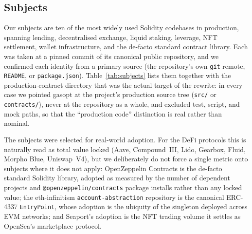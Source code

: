 
\subsection{Subjects}
\label{sec:subjects}

Our subjects are ten of the most widely used Solidity codebases in production, spanning
lending, decentralised exchange, liquid staking, leverage, NFT settlement, wallet
infrastructure, and the de-facto standard contract library. Each was taken at a pinned
commit of its canonical public repository, and we confirmed each identity from a primary
source (the repository's own \texttt{git} remote, \texttt{README}, or \texttt{package.json}).
Table~\ref{tab:subjects} lists them together with the production-contract directory that was
the actual target of the rewrite: in every case we pointed gasopt at the project's
production source tree (\texttt{src/} or \texttt{contracts/}), never at the repository as a
whole, and excluded test, script, and mock paths, so that the ``production code'' distinction
is real rather than nominal.

The subjects were selected for real-world adoption. For the DeFi protocols this is naturally
read as total value locked (Aave, Compound~III, Lido, Gearbox, Fluid, Morpho Blue, Uniswap~V4),
but we deliberately do not force a single metric onto subjects where it does not apply:
OpenZeppelin Contracts is the de-facto standard Solidity library, adopted as measured by the
number of dependent projects and \texttt{@openzeppelin/contracts} package installs rather than
any locked value; the eth-infinitism \texttt{account-abstraction} repository is the canonical
ERC-4337 \texttt{EntryPoint}, whose adoption is the ubiquity of the singleton deployed across
EVM networks; and Seaport's adoption is the NFT trading volume it settles as OpenSea's
marketplace protocol.
